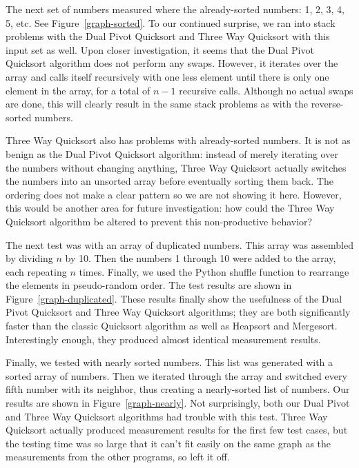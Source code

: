 \documentclass{article}
\begin{document}
The next set of numbers measured where the already-sorted numbers: 1, 2, 3, 4, 5, etc.
See Figure~\ref{graph-sorted}.
To our continued surprise, we ran into stack problems with the Dual Pivot Quicksort and
Three Way Quicksort with this input set as well. Upon closer investigation, it seems that
the Dual Pivot Quicksort algorithm does not perform any swaps. However, it iterates over
the array and calls itself recursively with one less element until there is only one element
in the array, for a total of $n-1$ recursive calls. Although no actual swaps are done, this
will clearly result in the same stack problems as with the reverse-sorted numbers.

Three Way Quicksort also has problems with already-sorted numbers. It is not as benign 
as the Dual Pivot Quicksort algorithm: instead of merely iterating over the numbers without
changing anything, Three Way Quicksort actually switches the numbers into an unsorted
array before eventually sorting them back. The ordering does not make a clear pattern
so we are not showing it here. However, this would be another area for future investigation:
how could the Three Way Quicksort algorithm be altered to prevent this non-productive 
behavior?

The next test was with an array of duplicated numbers. This array was assembled by
dividing $n$ by 10. Then the numbers 1 through 10 were added to the array, each repeating $n$
times. Finally, we used the Python shuffle function to rearrange the elements in pseudo-random
order. The test results are shown in Figure~\ref{graph-duplicated}. These results finally show
the usefulness of the Dual Pivot Quicksort and Three Way Quicksort algorithms; they are 
both significantly faster than the classic Quicksort algorithm as well as Heapsort and Mergesort.
Interestingly enough, they produced almost identical measurement results.

Finally, we tested with nearly sorted numbers. This list was generated with a sorted array
of numbers. Then we iterated through the array and switched every fifth number with its 
neighbor, thus creating a nearly-sorted list of numbers. Our results are shown in 
Figure~\ref{graph-nearly}. Not surprisingly, both our Dual Pivot and Three Way Quicksort
algorithms had trouble with this test. Three Way Quicksort actually produced measurement
results for the first few test cases, but the testing time was so large that it can't fit easily
on the same graph as the measurements from the other programs, so left it off.
\end{document}
